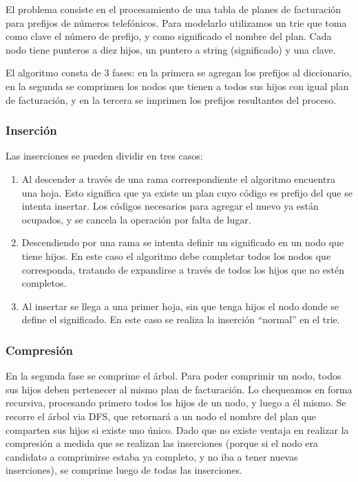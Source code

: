 El problema consiste en el procesamiento de una tabla de planes de facturación
para prefijos de números telefónicos. Para modelarlo utilizamos un trie
que toma como clave el número de prefijo, y como significado el nombre del
plan. Cada nodo tiene punteros a diez hijos, un puntero a string (significado)
y una clave.

El algoritmo consta de 3 fases: en la primera se agregan los prefijos al
diccionario, en la segunda se comprimen los nodos que tienen a todos sus hijos
con igual plan de facturación, y en la tercera se imprimen los prefijos
resultantes del proceso.

\subsubsection*{Inserción}

Las inserciones se pueden dividir en tres casos:

\begin{enumerate}
  \item Al descender a través de una rama correspondiente el algoritmo encuentra
  una hoja. Esto significa que ya existe un plan cuyo código es prefijo del
  que se intenta insertar. Los códigos necesarios para agregar el nuevo ya están
  ocupados, y se cancela la operación por falta de lugar.

  \item Descendiendo por una rama se intenta definir un significado en un nodo
  que tiene hijos. En este caso el algoritmo debe completar todos los nodos que
  corresponda, tratando de expandirse a través de todos los hijos que no
  estén completos.

  \item Al insertar se llega a una primer hoja, sin que tenga hijos el nodo
  donde se define el significado. En este caso se realiza la inserción ``normal''
  en el trie.
\end{enumerate}

\subsubsection*{Compresión}

En la segunda fase se comprime el árbol. Para poder comprimir un nodo, todos
sus hijos deben pertenecer al mismo plan de facturación. Lo chequeamos en
forma recursiva, procesando primero todos los hijos de un nodo, y luego a
él mismo. Se recorre el árbol via DFS, que retornará a un nodo el nombre
del plan que comparten sus hijos si existe uno único. Dado que no existe
ventaja en realizar la compresión a medida que se realizan las inserciones
(porque si el nodo era candidato a comprimirse estaba ya completo, y no
iba a tener nuevas inserciones), se comprime luego de todas las inserciones.

